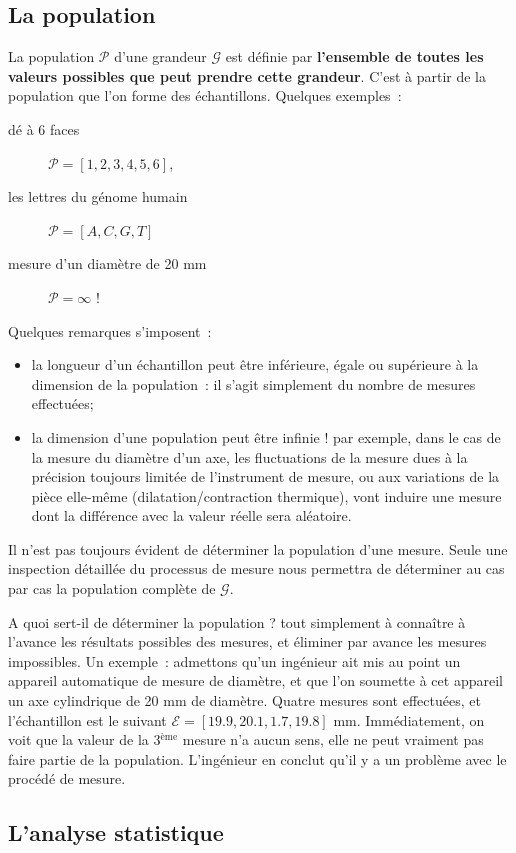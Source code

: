 \subsection{La population}

La population $\mathcal{P}$ d'une grandeur $\mathcal{G}$ est définie par \textbf{l'ensemble de toutes les valeurs possibles que peut prendre cette grandeur}. C'est à partir de la population que l'on forme des échantillons. Quelques exemples~:
\begin{description}
\item[dé à 6 faces] $\mathcal{P}=[1,2,3,4,5,6]$,
\item[les lettres du génome humain] $\mathcal{P}=[A,C,G,T]$
\item[mesure d'un diamètre de 20 mm] $\mathcal{P}=\infty$ !
\end{description}
Quelques remarques s'imposent~:
\begin{itemize}
\item la longueur d'un échantillon peut être inférieure, égale ou supérieure à la dimension de la population~: il s'agit simplement du nombre de mesures effectuées;
\item la dimension d'une population peut être infinie ! par exemple, dans le cas de la mesure du diamètre d'un axe, les fluctuations de la mesure dues à la précision toujours limitée de l'instrument de mesure, ou aux variations de la pièce elle-même (dilatation/contraction thermique), vont induire une mesure dont la différence avec la valeur réelle sera aléatoire.
\end{itemize}
Il n'est pas toujours évident de déterminer la population d'une mesure. Seule une inspection détaillée du processus de mesure nous permettra de déterminer au cas par cas la population complète de $\mathcal{G}$.

A quoi sert-il de déterminer la population ? tout simplement à connaître à l'avance les résultats possibles des mesures, et éliminer par avance les mesures impossibles. Un exemple~: admettons qu'un ingénieur ait mis au point un appareil automatique de mesure de diamètre, et que l'on soumette à cet appareil un axe cylindrique de 20 mm de diamètre. Quatre mesures sont effectuées, et l'échantillon est le suivant $\mathcal{E}=[19.9,20.1,1.7,19.8]$ mm. Immédiatement, on voit que la valeur de la 3$^\text{ème}$ mesure n'a aucun sens, elle ne peut vraiment pas faire partie de la population. L'ingénieur en conclut qu'il y a un problème avec le procédé de mesure.

\subsection{L'analyse statistique}

